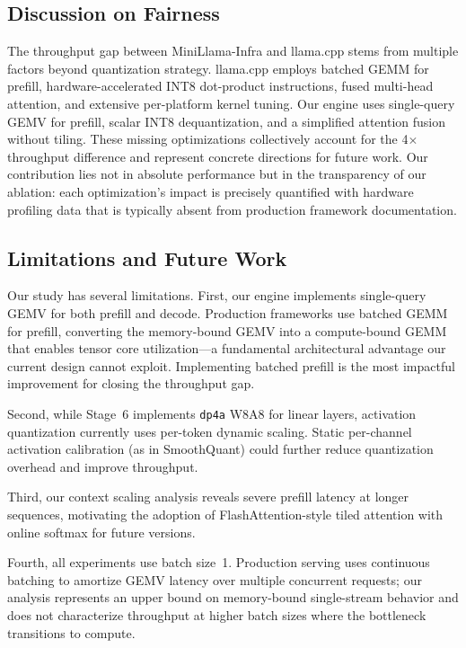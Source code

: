 \documentclass[conference]{IEEEtran}
\begin{document}
\subsection{Discussion on Fairness}
The throughput gap between MiniLlama-Infra and llama.cpp stems from multiple factors beyond quantization strategy. llama.cpp employs batched GEMM for prefill, hardware-accelerated INT8 dot-product instructions, fused multi-head attention, and extensive per-platform kernel tuning. Our engine uses single-query GEMV for prefill, scalar INT8 dequantization, and a simplified attention fusion without tiling. These missing optimizations collectively account for the 4$\times$ throughput difference and represent concrete directions for future work. Our contribution lies not in absolute performance but in the transparency of our ablation: each optimization's impact is precisely quantified with hardware profiling data that is typically absent from production framework documentation.

\subsection{Limitations and Future Work}

Our study has several limitations. First, our engine implements single-query GEMV for both prefill and decode. Production frameworks use batched GEMM for prefill, converting the memory-bound GEMV into a compute-bound GEMM that enables tensor core utilization---a fundamental architectural advantage our current design cannot exploit. Implementing batched prefill is the most impactful improvement for closing the throughput gap.

Second, while Stage~6 implements \texttt{dp4a} W8A8 for linear layers, activation quantization currently uses per-token dynamic scaling. Static per-channel activation calibration (as in SmoothQuant) could further reduce quantization overhead and improve throughput.

Third, our context scaling analysis reveals severe prefill latency at longer sequences, motivating the adoption of FlashAttention-style tiled attention with online softmax for future versions.

Fourth, all experiments use batch size~1. Production serving uses continuous batching to amortize GEMV latency over multiple concurrent requests; our analysis represents an upper bound on memory-bound single-stream behavior and does not characterize throughput at higher batch sizes where the bottleneck transitions to compute.
\end{document}
